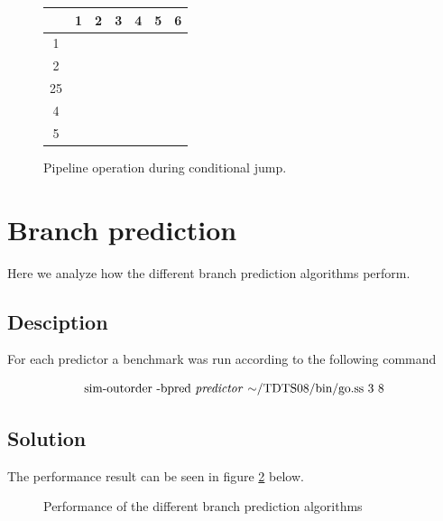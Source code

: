 \documentclass[titlepage, a4paper]{article}
\begin{document}
\begin{figure}[H]
  \centering
  \begin{tabular}{|c|c|c|c|c|c|c|}
    \hline
        {} & {1} & {2} & {3} & {4} & {5} & {6} \\ \hline
        {1} & \cellcolor{blue!25}{IF} & \cellcolor{orange!25}{EX} & {} & {} & {} & {} \\ \hline
        {2} & {} & \cellcolor{blue!25}{IF} & \cellcolor{orange!25}{EX} & {} & {} & {} \\ \hline
        {25} & {} & {} & \cellcolor{blue!25}{IF} & {} & {} & {} \\ \hline
        {4} & {} & {} & {} & \cellcolor{blue!25}{IF} & \cellcolor{orange!25}{EX} & {} \\ \hline
        {5} & {} & {} & {} & {} & \cellcolor{blue!25}{IF} & \cellcolor{orange!25}{EX} \\ \hline
  \end{tabular}
  \caption{Pipeline operation during conditional jump.}
  \label{fig:condjmp_pipe_op}
\end{figure}

\section{Branch prediction}
Here we analyze how the different branch prediction algorithms perform.

\subsection{Desciption}
For each predictor a benchmark was run according to the following command

$$\text{sim-outorder -bpred \textit{predictor} $\mathtt{\sim}$/TDTS08/bin/go.ss 3 8}$$


\subsection{Solution}
The performance result can be seen in figure \ref{fig:performance} below.

\begin{figure}[H]
	\centering
	\caption{Performance of the different branch prediction algorithms}
	\label{fig:performance}
\end{figure}
\end{document}
